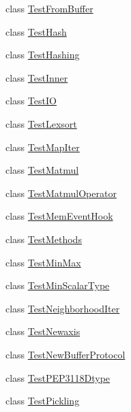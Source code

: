 \begin{DoxyCompactItemize}
\item 
class \hyperlink{classnumpy_1_1core_1_1tests_1_1test__multiarray_1_1TestFromBuffer}{Test\+From\+Buffer}
\item 
class \hyperlink{classnumpy_1_1core_1_1tests_1_1test__multiarray_1_1TestHash}{Test\+Hash}
\item 
class \hyperlink{classnumpy_1_1core_1_1tests_1_1test__multiarray_1_1TestHashing}{Test\+Hashing}
\item 
class \hyperlink{classnumpy_1_1core_1_1tests_1_1test__multiarray_1_1TestInner}{Test\+Inner}
\item 
class \hyperlink{classnumpy_1_1core_1_1tests_1_1test__multiarray_1_1TestIO}{Test\+IO}
\item 
class \hyperlink{classnumpy_1_1core_1_1tests_1_1test__multiarray_1_1TestLexsort}{Test\+Lexsort}
\item 
class \hyperlink{classnumpy_1_1core_1_1tests_1_1test__multiarray_1_1TestMapIter}{Test\+Map\+Iter}
\item 
class \hyperlink{classnumpy_1_1core_1_1tests_1_1test__multiarray_1_1TestMatmul}{Test\+Matmul}
\item 
class \hyperlink{classnumpy_1_1core_1_1tests_1_1test__multiarray_1_1TestMatmulOperator}{Test\+Matmul\+Operator}
\item 
class \hyperlink{classnumpy_1_1core_1_1tests_1_1test__multiarray_1_1TestMemEventHook}{Test\+Mem\+Event\+Hook}
\item 
class \hyperlink{classnumpy_1_1core_1_1tests_1_1test__multiarray_1_1TestMethods}{Test\+Methods}
\item 
class \hyperlink{classnumpy_1_1core_1_1tests_1_1test__multiarray_1_1TestMinMax}{Test\+Min\+Max}
\item 
class \hyperlink{classnumpy_1_1core_1_1tests_1_1test__multiarray_1_1TestMinScalarType}{Test\+Min\+Scalar\+Type}
\item 
class \hyperlink{classnumpy_1_1core_1_1tests_1_1test__multiarray_1_1TestNeighborhoodIter}{Test\+Neighborhood\+Iter}
\item 
class \hyperlink{classnumpy_1_1core_1_1tests_1_1test__multiarray_1_1TestNewaxis}{Test\+Newaxis}
\item 
class \hyperlink{classnumpy_1_1core_1_1tests_1_1test__multiarray_1_1TestNewBufferProtocol}{Test\+New\+Buffer\+Protocol}
\item 
class \hyperlink{classnumpy_1_1core_1_1tests_1_1test__multiarray_1_1TestPEP3118Dtype}{Test\+P\+E\+P3118\+Dtype}
\item 
class \hyperlink{classnumpy_1_1core_1_1tests_1_1test__multiarray_1_1TestPickling}{Test\+Pickling}

\end{DoxyCompactItemize}
